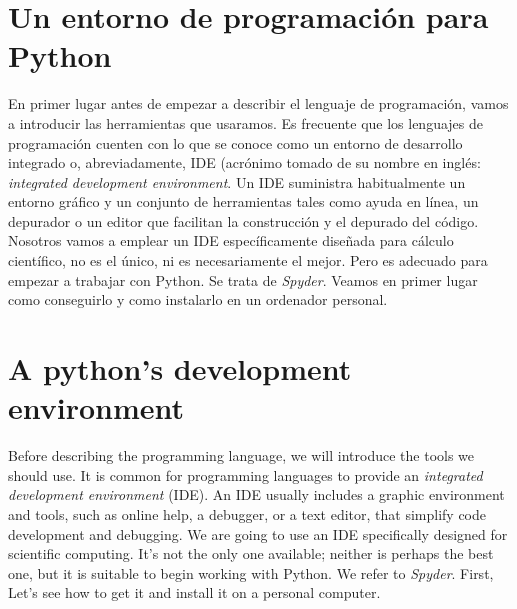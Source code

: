 \begin{paracol}{2}
\section[Un entorno de programación para Python]{Un entorno de programación para Python}
En primer lugar antes de empezar a describir el lenguaje de programación, vamos a introducir las herramientas  que usaramos. Es frecuente que los lenguajes de programación cuenten con lo que se conoce como un entorno de desarrollo integrado o, abreviadamente, IDE (acrónimo tomado de su nombre en inglés: \emph{integrated development environment}. Un IDE suministra habitualmente un entorno gráfico y un conjunto de herramientas tales como ayuda en línea, un depurador o un editor que facilitan la construcción y el depurado del código. Nosotros vamos a emplear un IDE específicamente diseñada para cálculo científico, no es el único, ni es necesariamente el mejor. Pero es adecuado para empezar a trabajar con Python. Se trata de \emph{Spyder}. Veamos en primer lugar como conseguirlo y como instalarlo en un ordenador personal.

\switchcolumn
\section{A python's development environment}
Before describing the programming language, we will introduce the tools we should use. It is common for programming languages to provide an \emph{integrated development environment} (IDE). An IDE usually includes a graphic environment and tools, such as online help,  a debugger, or a text editor, that simplify code development and debugging. We are going to use an IDE specifically designed for scientific computing. It's not the only one available; neither is perhaps the best one, but it is suitable to begin working with Python. We refer to \emph{Spyder}. First, Let's see how to get it and install it on a personal computer.
\end{paracol}
